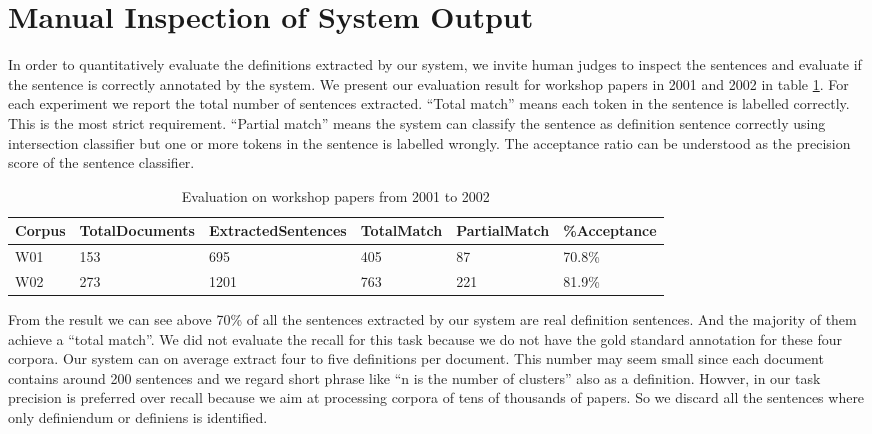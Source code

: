 \documentclass[hyp]{socreport}
\begin{document}
\section{Manual Inspection of System Output}

In order to quantitatively evaluate the definitions extracted by our system, we invite human judges to inspect the sentences and evaluate if the sentence is correctly annotated by the system. We present our evaluation result for workshop papers in 2001 and 2002 in table \ref{unsupervised}. For each experiment we report the total number of sentences extracted. ``Total match'' means each token in the sentence is labelled correctly. This is the most strict requirement. ``Partial match'' means the system can classify the sentence as definition sentence correctly using intersection classifier but one or more tokens in the sentence is labelled wrongly. The acceptance ratio can be understood as the precision score of the sentence classifier.

\begin{table}
	
    \centering
    \begin{tabular}{|p{2.2cm}|p{2.2cm}|p{2.2cm}|p{2.2cm}|p{2.2cm}|p{2.2cm}|}
\hline
        \bf{Corpus}                            & \bf{Total\newline Documents}                                  & \bf{Extracted\newline Sentences} & \bf{Total\newline Match} & \bf{Partial\newline Match} & \bf{\%\newline Acceptance}                     \\ \hline
        W01     & 153   & 695  & 405 & 87 & 70.8\%                   \\ \hline
        W02     & 273   & 1201  & 763 & 221 & 81.9\%                   \\ \hline

    \end{tabular}
    \caption{Evaluation on workshop papers from 2001 to 2002}
    \label{unsupervised}
\end{table}

From the result we can see above 70\% of all the sentences extracted by our system are real definition sentences. And the majority of them achieve a ``total match''. We did not evaluate the recall for this task because we do not have the gold standard annotation for these four corpora. Our system can on average extract four to five definitions per document. This number may seem small since each document contains around 200 sentences and we regard short phrase like ``n is the number of clusters'' also as a definition. Howver, in our task precision is preferred over recall because we aim at processing corpora of tens of thousands of papers. So we discard all the sentences where only definiendum or definiens is identified. 
\end{document}
